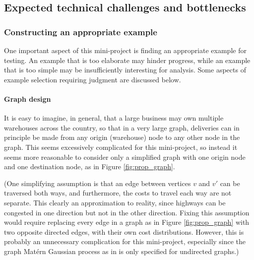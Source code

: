 
\subsection{Expected technical challenges and bottlenecks}

\subsubsection{Constructing an appropriate example}

One important aspect of this mini-project is finding an appropriate example for testing. An example that is too elaborate may hinder progress, while an example that is too simple may be insufficiently interesting for analysis. Some aspects of example selection requiring judgment are discussed below.

\paragraph{Graph design} It is easy to imagine, in general, that a large business may own multiple warehouses across the country, so that in a very large graph, deliveries can in principle be made from any origin (warehouse) node to any other node in the graph. This seems excessively complicated for this mini-project, so instead it seems more reasonable to consider only a simplified graph with one origin node and one destination node, as in Figure \ref{fig:prop_graph}.

(One simplifying assumption is that an edge between vertices $v$ and $v'$ can be traversed both ways, and furthermore, the costs to travel each way are not separate. This clearly an approximation to reality, since highways can be congested in one direction but not in the other direction. Fixing this assumption would require replacing every edge in a graph as in Figure \ref{fig:prop_graph} with two opposite directed edges, with their own cost distributions. However, this is probably an unnecessary complication for this mini-project, especially since the graph Mat\'{e}rn Gaussian process as in \cite{pmlr-v130-borovitskiy21a} is only specified for undirected graphs.)

